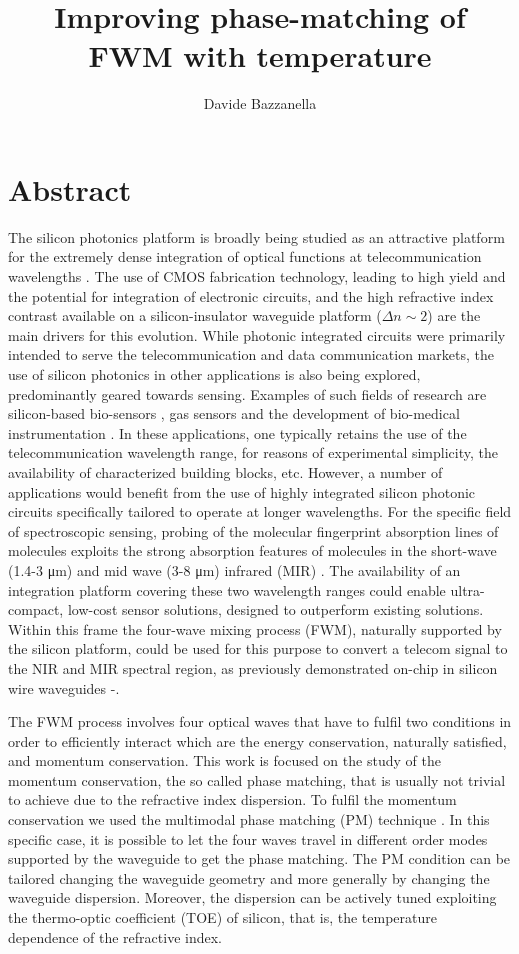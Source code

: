 \documentclass[12pt,a4paper,twoside]{article}
\author{Davide Bazzanella}
\title{Improving phase-matching of FWM with temperature}
\begin{document}

\cleardoublepage
\section*{Abstract}
The silicon photonics platform is broadly being studied as an attractive platform for the extremely dense integration of optical functions at telecommunication wavelengths \cite{Jalali}.
The use of CMOS fabrication technology, leading to high yield and the potential for integration of electronic circuits, and the high refractive index contrast available on a silicon-insulator waveguide platform ($\Delta n \sim 2$) are the main drivers for this evolution.
While photonic integrated circuits were primarily intended to serve the telecommunication and data communication markets, the use of silicon photonics in other applications is also being explored, predominantly geared towards sensing.
Examples of such fields of research are silicon-based bio-sensors \cite{DeVos}, gas sensors \cite{Robinson} and the development of bio-medical instrumentation \cite{Dumon}.
In these applications, one typically retains the use of the telecommunication wavelength range, for reasons of experimental simplicity, the availability of characterized building blocks, etc.
However, a number of applications would benefit from the use of highly integrated silicon photonic circuits specifically tailored to operate at longer wavelengths.
For the specific field of spectroscopic sensing, probing of the molecular fingerprint absorption lines of molecules exploits the strong absorption features of molecules in the short-wave (1.4-3 \si{\um}) and mid wave (3-8 \si{\um}) infrared (MIR) \cite{Crowder}.
The availability of an integration platform covering these two wavelength ranges could enable ultra-compact, low-cost sensor solutions, designed to outperform existing solutions. Within this frame the four-wave mixing process (FWM), naturally supported by the silicon platform, could be used for this purpose to convert a telecom signal to the NIR and MIR spectral region, as previously demonstrated on-chip in silicon wire waveguides \cite{Espinola}-\cite{Foster}.

The FWM process involves four optical waves that have to fulfil two conditions in order to efficiently interact which are the energy conservation, naturally satisfied, and momentum conservation.
This work is focused on the study of the momentum conservation, the so called phase matching, that is usually not trivial to achieve due to the refractive index dispersion.
To fulfil the momentum conservation we used the multimodal phase matching (PM) technique \cite{agrawal}.
In this specific case, it is possible to let the four waves travel in different order modes supported by the waveguide to get the phase matching.
The PM condition can be tailored changing the waveguide geometry and more generally by changing the waveguide dispersion.
Moreover, the dispersion can be actively tuned exploiting the thermo-optic coefficient (TOE) of silicon, that is, the temperature dependence of the refractive index.
\end{document}

